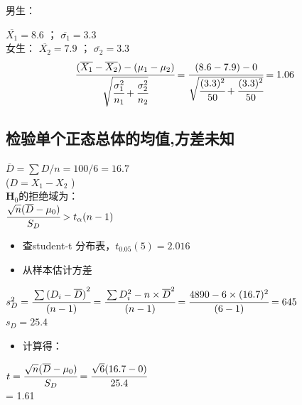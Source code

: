 \begin{description}
\tightlist
\item[]
男生：
\end{description}

\(\overline{X_1} = 8.6\) ； \(\overline{\sigma_1} = 3.3\)\\
女生： \(\overline{X_2} = 7.9\) ； \(\overline{\sigma_2} = 3.3\)\\

\[\cfrac{ (\overline{X_1} - \overline{X_2}) - ({\mu}_1  - {\mu}_2)}{\sqrt{\cfrac{\sigma_1^2}{n_1} + \cfrac{\sigma_2^2}{n_2}}} = \cfrac{ (8.6 - 7.9) - 0 }{\sqrt{\cfrac{(3.3)^2}{50} + \cfrac{(3.3)^2}{50}}} = 1.06\]

\hypertarget{ux68c0ux9a8cux5355ux4e2aux6b63ux6001ux603bux4f53ux7684ux5747ux503cux65b9ux5deeux672aux77e5-1}{%
\subsection{检验单个正态总体的均值,方差未知}\label{ux68c0ux9a8cux5355ux4e2aux6b63ux6001ux603bux4f53ux7684ux5747ux503cux65b9ux5deeux672aux77e5-1}}

\(\overline{D} = \sum D / n = 100/6 = 16.7\)\\
(\(D = X_1 - X_2\) )\\
\(\mathbf{H}_0\)的拒绝域为：\\
\(\cfrac{ \sqrt{n}(\overline{D} - \mu _0) }{S_D}  > t_\alpha(n-1)\)\\

\begin{itemize}
\tightlist
\item
  查student-t 分布表，\(t_{0.05} (5) = 2.016\)
\item
  从样本估计方差\\
\end{itemize}

\(s_D^2 = \cfrac{\sum {(D_i - \overline{D})}^2  }{(n - 1)}= \cfrac{\sum D_i^2 - n \times \overline{D}^2  }{(n - 1)} = \cfrac{4890 - 6 \times (16.7)^2  }{(6 - 1)} = 645\)\\
\(s_D = 25.4\)\\

\begin{itemize}
\tightlist
\item
  计算得：
\end{itemize}

\(t = \cfrac{ \sqrt{n}(\overline{D} - \mu _0) }{S_D} = \cfrac{ \sqrt{6}(16.7 - 0) }{25.4}\)\\
= 1.61\\




